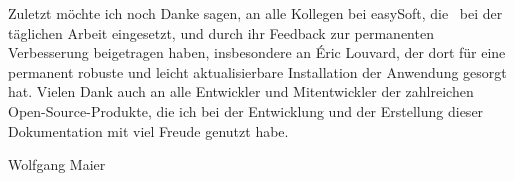 Zuletzt möchte ich noch Danke sagen, an alle Kollegen bei easySoft, die \FPZ\ bei der täglichen Arbeit eingesetzt, und durch ihr Feedback zur permanenten Verbesserung beigetragen haben, insbesondere an \'Eric Louvard, der dort für eine permanent robuste und leicht aktualisierbare Installation der Anwendung gesorgt hat. Vielen Dank auch an alle Entwickler und Mitentwickler der zahlreichen Open-Source-Produkte, die ich bei der Entwicklung und der Erstellung dieser Dokumentation mit viel Freude genutzt habe.

\hspace*{\fill}Wolfgang Maier

\newpage

